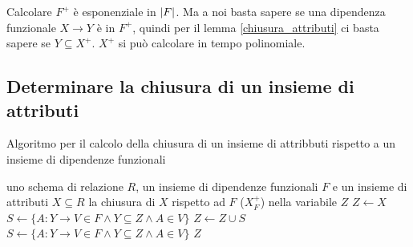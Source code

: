 Calcolare $F^+$ \`e esponenziale in $\left\lvert{F}\right\rvert$. Ma a noi basta sapere se una dipendenza funzionale $X \to Y$ \`e in $F^+$, quindi per il lemma \ref{chiusura_attributi} ci basta sapere se $Y \subseteq X^+$. $X^+$ si pu\`o calcolare in tempo polinomiale.

\subsection{Determinare la chiusura di un insieme di attributi}

\begin{algorithm}
\caption{Algoritmo per il calcolo della chiusura di un insieme di attribbuti rispetto a un insieme di dipendenze funzionali}
\label{algoritmo_chiusura}
\begin{algorithmic}
\Require uno schema di relazione $R$, un insieme di dipendenze funzionali $F$ e un insieme di attributi $X \subseteq R$
\Ensure la chiusura di $X$ rispetto ad $F$ ($X^+_F$) nella variabile $Z$
\State $Z \gets X$
\State $S \gets \{ A : Y \to V \in F \land Y \subseteq Z \land A \in V \}$
    \State $Z \gets Z \cup S$
    \State $S \gets \{ A : Y \to V \in F \land Y \subseteq Z \land A \in V \}$
\EndWhile
\State \Return $Z$
\end{algorithmic}
\end{algorithm}

